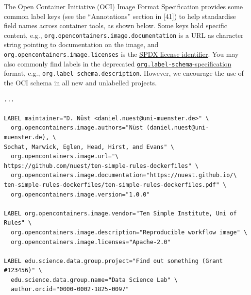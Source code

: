 \documentclass[10pt,letterpaper]{article}
\begin{document}
The Open Container Initiative (OCI) Image Format Specification provides
some common label keys (see the ``Annotations'' section in {[}41{]}) to
help standardise field names across container tools, as shown below.
Some keys hold specific content, e.g.,
\texttt{org.opencontainers.image.documentation} is a URL as character
string pointing to documentation on the image, and
\texttt{org.opencontainers.image.licenses} is the
\href{https://spdx.org/licenses/}{SPDX license identifier}. You may also
commonly find labels in the deprecated
\href{http://label-schema.org/rc1/}{\texttt{org.label-schema}-specification}
format, e.g., \texttt{org.label-schema.description}. However, we
encourage the use of the OCI schema in all new and unlabelled projects.

\scriptsize

\begin{minipage}{\linewidth}

\begin{lstlisting}[language=docker,caption={Partial \texttt{Dockerfile} with commonly used labels; note the line breaks within the values (using the \texttt{\textbackslash} character), which were added to limit line length, are not preceded by a space character, as this space would appear in the value, whereas the line breaks between keys and values are separated by whitespace for readability.},breaklines=true,label={lst:labels}]
...

LABEL maintainer="D. Nüst <daniel.nuest@uni-muenster.de>" \
  org.opencontainers.image.authors="Nüst (daniel.nuest@uni-muenster.de), \
Sochat, Marwick, Eglen, Head, Hirst, and Evans" \
  org.opencontainers.image.url="\
https://github.com/nuest/ten-simple-rules-dockerfiles" \
  org.opencontainers.image.documentation="https://nuest.github.io/\
ten-simple-rules-dockerfiles/ten-simple-rules-dockerfiles.pdf" \
  org.opencontainers.image.version="1.0.0"

LABEL org.opencontainers.image.vendor="Ten Simple Institute, Uni of Rules" \
  org.opencontainers.image.description="Reproducible workflow image" \
  org.opencontainers.image.licenses="Apache-2.0"

LABEL edu.science.data.group.project="Find out something (Grant #123456)" \
  edu.science.data.group.name="Data Science Lab" \
  author.orcid="0000-0002-1825-0097"
\end{lstlisting}

\end{minipage}

\normalsize
\end{document}
